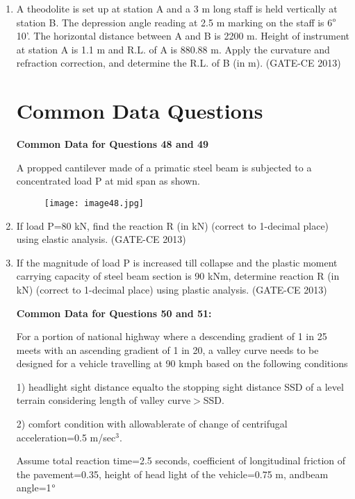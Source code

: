 \documentclass[journal,12pt,onecolumn]{article}
\theoremstyle{remark}
\begin{document}
\begin{enumerate}
    \item A theodolite is set up at station A and a 3 m long staff is held vertically at station B. The depression angle reading at 2.5 m marking on the staff is 6$\degree$10'. The horizontal distance between A and B is 2200 m. Height of instrument at station A is 1.1 m and R.L. of A is 880.88 m. Apply the curvature and refraction correction, and determine the R.L. of B (in m). \underline{\hspace{3cm}} (GATE-CE 2013)

    \section*{Common Data Questions}
    \textbf{Common Data for Questions 48 and 49}

    
    A propped cantilever made of a primatic steel beam is subjected to a concentrated load P at mid span as shown.
    \begin{figure}[H]
    \centering
    \texttt{[image: image48.jpg]}  
    \caption{}
    \label{fig:9}
    \end{figure}
    
    \item If load P=80 kN, find the reaction R (in kN) (correct to 1-decimal place) using elastic analysis. \underline{\hspace{3cm}} (GATE-CE 2013)
    
    \item If the magnitude of load P is increased till collapse and the plastic moment carrying capacity of steel beam section is 90 kNm, determine reaction R (in kN) (correct to 1-decimal place) using plastic analysis. \underline{\hspace{3cm}} (GATE-CE 2013)


    \textbf{Common Data for Questions 50 and 51:}

    
    For a portion of national highway where a descending gradient of 1 in 25 meets with an ascending gradient of 1 in 20, a valley curve needs to be designed for a vehicle travelling at 90 kmph based on the following conditions

    1) headlight sight distance equalto the stopping sight distance SSD of a level terrain considering length of valley curve$>$SSD.
    
    2) comfort condition with allowablerate of change of centrifugal acceleration=0.5 m/sec$^3$.

    Assume total reaction time=2.5 seconds, coefficient of longitudinal friction of the pavement=0.35, height of head light of the vehicle=0.75 m, andbeam angle=1$\degree$


\end{enumerate}
\end{document}
